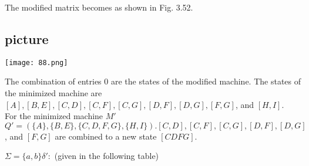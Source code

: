 \documentclass[8pt]{beamer}
\begin{document}
\begin{frame}
\hspace*{0.4cm} The modified matrix becomes as shown in Fig. 3.52.\\
\begin{center}
\section{picture}
\texttt{[image: 88.png]}
\end{center}

The combination of entries 0 are the states of the modified machine. The states of the minimized
machine are $[A], [B, E], [C, D], [C, F], [C, G], [D, F], [D, G], [F, G]$, and $[H, I]$.\\
\hspace*{0.4cm} For the minimized machine $M'$\\
\hspace*{0.4cm} $Q' = (\{A\}, \{B, E\}, \{C, D, F, G\}, \{H, I\}). [C, D], [C, F], [C, G], [D, F], [D, G]$, and $[F, G]$ are
combined to a new state $[CDFG]$.\\

\begin{center}
  $\Sigma = \{a, b\} \delta':$ (given in the following table)
\end{center}
\end{frame}
\end{document}
